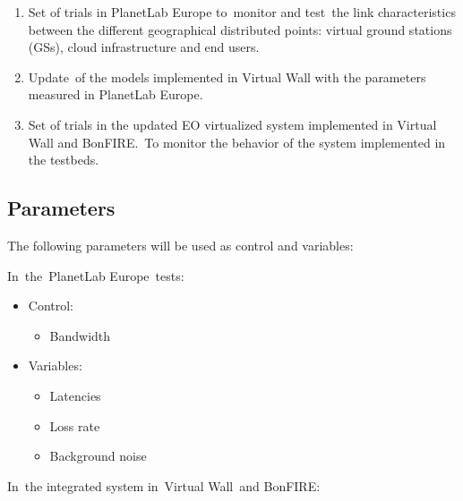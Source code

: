 \documentclass[a4paper]{article}
\newcounter{saveenum}
\newcommand\liststyleLFOxxxvii{%
\renewcommand\labelitemi{[F0B7?]}
\renewcommand\labelitemii{o}
\renewcommand\labelitemiii{[F0A7?]}
\renewcommand\labelitemiv{[F0B7?]}
}
\newcommand\liststyleLFOxxxviii{%
\renewcommand\theenumi{\roman{enumi}}
\renewcommand\theenumii{\alph{enumii}}
\renewcommand\theenumiii{\roman{enumiii}}
\renewcommand\theenumiv{\arabic{enumiv}}
\renewcommand\labelenumi{\theenumi)}
\renewcommand\labelenumii{\theenumii.}
\renewcommand\labelenumiii{\theenumiii.}
\renewcommand\labelenumiv{\theenumiv.}
}
\begin{document}
\bigskip

\liststyleLFOxxxviii
\setcounter{saveenum}{\value{enumi}}
\begin{enumerate}
\setcounter{enumi}{\value{saveenum}}
\item Set of trials in PlanetLab Europe to\ monitor and test\ the link
characteristics between the different geographical distributed points:
virtual ground stations (GSs), cloud infrastructure and end users.\ 
\item Update\ of the models implemented in Virtual Wall with the
parameters measured in PlanetLab Europe.
\item Set of trials in the updated EO virtualized system implemented in
Virtual Wall and BonFIRE.\ To monitor the behavior of the system
implemented in the testbeds.
\end{enumerate}

\bigskip

\subsection[Parameters]{Parameters}
\label{bkm:Ref378661331}\hypertarget{Toc378868690}{}
\bigskip

The following parameters will be used as control and variables:


\bigskip

In\ the\ PlanetLab Europe\ tests:

\liststyleLFOxxxvii
\begin{itemize}
\item Control:\ 

\begin{itemize}
\item Bandwidth
\end{itemize}
\item Variables:\ 

\begin{itemize}
\item Latencies
\item Loss rate
\item Background noise
\end{itemize}
\end{itemize}

\bigskip

In\ the integrated system in\ Virtual Wall\ and BonFIRE:


\bigskip
\end{document}
